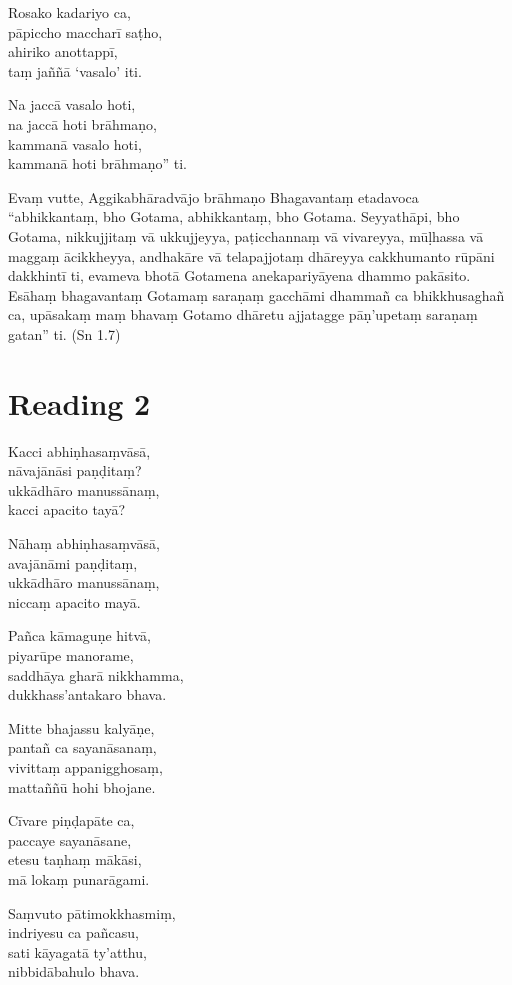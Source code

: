 Rosako kadariyo ca,\\
pāpiccho maccharī saṭho,\\
ahiriko anottappī,\\
taṃ jaññā ‘vasalo’ iti.

Na jaccā vasalo hoti,\\
na jaccā hoti brāhmaṇo,\\
kammanā vasalo hoti,\\
kammanā hoti brāhmaṇo” ti.

Evaṃ vutte, Aggikabhāradvājo brāhmaṇo Bhagavantaṃ etadavoca “abhikkantaṃ, bho Gotama, abhikkantaṃ, bho Gotama. Seyyathāpi, bho Gotama, nikkujjitaṃ vā ukkujjeyya, paṭicchannaṃ vā vivareyya, mūḷhassa vā maggaṃ ācikkheyya, andhakāre vā telapajjotaṃ dhāreyya cakkhumanto rūpāni dakkhintī ti, evameva bhotā Gotamena anekapariyāyena dhammo pakāsito. Esāhaṃ bhagavantaṃ Gotamaṃ saraṇaṃ gacchāmi dhammañ ca bhikkhusaghañ ca, upāsakaṃ maṃ bhavaṃ Gotamo dhāretu ajjatagge pāṇ’upetaṃ saraṇaṃ gatan” ti. \hfill(Sn 1.7)

\section*{Reading 2}

Kacci abhiṇhasaṃvāsā,\\
nāvajānāsi paṇḍitaṃ?\\
ukkādhāro manussānaṃ,\\
kacci apacito tayā?

Nāhaṃ abhiṇhasaṃvāsā,\\
avajānāmi paṇḍitaṃ,\\
ukkādhāro manussānaṃ,\\
niccaṃ apacito mayā.

Pañca kāmaguṇe hitvā,\\
piyarūpe manorame,\\
saddhāya gharā nikkhamma,\\
dukkhass’antakaro bhava.

Mitte bhajassu kalyāṇe,\\
pantañ ca sayanāsanaṃ,\\
vivittaṃ appanigghosaṃ,\\
mattaññū hohi bhojane.

Cīvare piṇḍapāte ca,\\
paccaye sayanāsane,\\
etesu taṇhaṃ mākāsi,\\
mā lokaṃ punarāgami.

Saṃvuto pātimokkhasmiṃ,\\
indriyesu ca pañcasu,\\
sati kāyagatā ty’atthu,\\
nibbidābahulo bhava.

